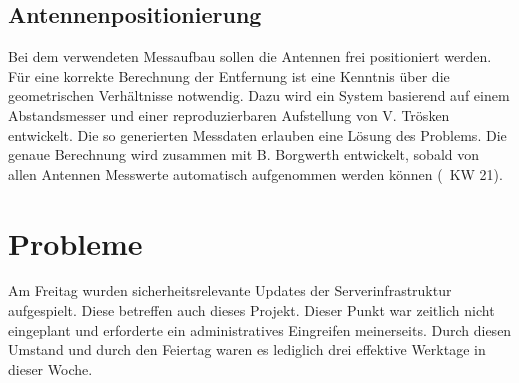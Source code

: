 \documentclass[a4paper,12pt,fleqn]{article}
\begin{document}
\subsection{Antennenpositionierung}
Bei dem verwendeten Messaufbau sollen die Antennen frei positioniert werden. Für eine korrekte Berechnung der Entfernung ist eine Kenntnis über die geometrischen Verhältnisse notwendig. Dazu wird ein System basierend auf einem Abstandsmesser und einer reproduzierbaren Aufstellung von V. Trösken entwickelt. Die so generierten Messdaten erlauben eine Lösung des Problems. Die genaue Berechnung wird zusammen mit B. Borgwerth entwickelt, sobald von allen Antennen Messwerte automatisch aufgenommen werden können (~KW 21).

\section[Probleme]{Probleme}
Am Freitag wurden sicherheitsrelevante Updates der Serverinfrastruktur aufgespielt. Diese betreffen auch dieses Projekt. Dieser Punkt war zeitlich nicht eingeplant und erforderte ein administratives Eingreifen meinerseits. Durch diesen Umstand und durch den Feiertag waren es lediglich drei effektive Werktage in dieser Woche.



\newpage


\end{document}
